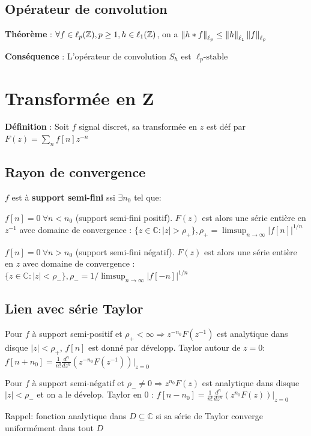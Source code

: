\subsection*{Opérateur de convolution}

\textbf{Théorème} : $\forall f\in\ell_{p}(\mathbb{Z}), p\geq 1, h\in\ell_{1}(\mathbb{Z})$, on a $\left\lVert h*f\right\rVert_{\ell_{p}} \leq \left\lVert h\right\rVert_{\ell_{1}}\left\lVert f\right\rVert_{\ell_{p}}$

\textbf{Conséquence} : L'opérateur de convolution $S_h$ est $\ell_p\text{-stable}$


\section*{Transformée en Z}

\textbf{Définition} : Soit $f$ signal discret, sa transformée en $z$ est déf par $F(z) = \sum_n f[n]z^{-n}$

\subsection*{Rayon de convergence}

$f$ est à \textbf{support semi-fini} ssi $\exists n_0$ tel que:

\begin{myitemize}
    \item $f[n] = 0 \: \forall n < n_0$ (support semi-fini positif). $F(z)$ est alors une série entière en $z^{-1}$ avec domaine de convergence : $\{z\in\mathbb{C} : |z| > \rho_+\}, \rho_+ = \limsup_{n\rightarrow\infty}|f[n]|^{1/n}$
    \item $f[n]=0 \:\forall n>n_0$ (support semi-fini négatif). $F(z)$ est alors une série entière en $z$ avec domaine de convergence : $\{z\in\mathbb{C} : |z| < \rho_-\}, \rho_- = 1/\limsup_{n\rightarrow\infty}|f[-n]|^{1/n}$
\end{myitemize}

\subsection*{Lien avec série Taylor}

\begin{myitemize}
\item Pour $f$ à support semi-positif et $\rho_+<\infty \Rightarrow z^{-n_0}F(z^{-1})$ est analytique dans disque $|z|<\rho_+$, $f[n]$ est donné par développ. Taylor autour de $z=0$: 
$f[n+n_0] = \frac{1}{n!}\frac{d^n}{dz^n}\left(z^{-n_0}F(z^{-1})\right)\rvert_{z=0}$

\item Pour $f$ à support semi-négatif et $\rho_- \neq 0 \Rightarrow z^{n_0}F(z)$ est analytique dans disque $|z|<\rho_-$ et on a le dévelop. Taylor en 0 : 
$f[n-n_0] = \frac{1}{n!}\frac{d^n}{dz^n}\left(z^{n_0}F(z)\right)\rvert_{z=0}$

\item Rappel: fonction analytique dans $D\subseteq \mathbb{C}$ si sa série de Taylor converge uniformément dans tout $D$
\end{myitemize}


